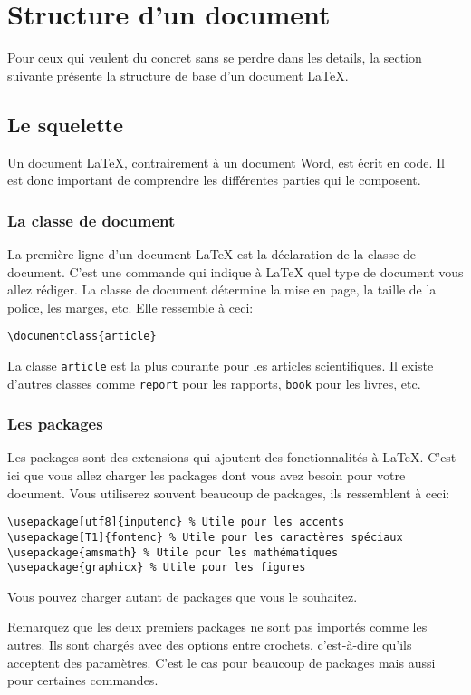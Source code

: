 \section{Structure d'un document}\label{sec:structure}
Pour ceux qui veulent du concret sans se perdre dans les details,
la section suivante présente la structure de base d'un document LaTeX.

\subsection{Le squelette}\label{subsec:latex_skeleton}
Un document LaTeX, contrairement à un document Word, est écrit en code.
Il est donc important de comprendre les différentes parties qui le composent.

\subsubsection{La classe de document}
La première ligne d'un document LaTeX est la déclaration de la classe de document.
C'est une commande qui indique à LaTeX quel type de document vous allez rédiger.
La classe de document détermine la mise en page, la taille de la police, les marges, etc.
Elle ressemble à ceci:
\begin{verbatim}
\documentclass{article}
\end{verbatim}
La classe \texttt{article} est la plus courante pour les articles scientifiques.
Il existe d'autres classes comme \texttt{report} pour les rapports, \texttt{book} pour les livres, etc.

\subsubsection{Les packages}
Les packages sont des extensions qui ajoutent des fonctionnalités à LaTeX.
C'est ici que vous allez charger les packages dont vous avez besoin pour votre document.
Vous utiliserez souvent beaucoup de packages, ils ressemblent à ceci:
\begin{verbatim}
\usepackage[utf8]{inputenc} % Utile pour les accents
\usepackage[T1]{fontenc} % Utile pour les caractères spéciaux
\usepackage{amsmath} % Utile pour les mathématiques
\usepackage{graphicx} % Utile pour les figures
\end{verbatim}
Vous pouvez charger autant de packages que vous le souhaitez.

Remarquez que les deux premiers packages ne sont pas importés comme les autres.
Ils sont chargés avec des options entre crochets, c'est-à-dire qu'ils acceptent des paramètres.
C'est le cas pour beaucoup de packages mais aussi pour certaines commandes.

